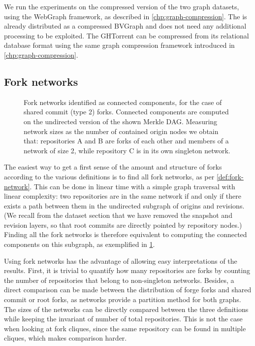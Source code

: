 We run the experiments on the compressed version of the two graph datasets,
using the WebGraph framework, as described in \cref{chp:graph-compression}.
The \SWHGD{} is already distributed as a compressed BVGraph and does not need
any additional processing to be exploited.
The GHTorrent can be compressed from its relational
database format using the same graph compression framework introduced in
\cref{chp:graph-compression}.

\subsection{Fork networks}
\label{sec:methodology-fork-networks}

\begin{figure}[t]
  \centering
  
  \caption{Fork networks identified as connected components, for the case of
    shared commit (type 2) forks. Connected components are computed on the
    undirected version of the shown Merkle DAG. Measuring network sizes as the
    number of contained origin nodes we obtain that: repositories A and B
    are forks of each other and members of a network of size 2, while
    repository C is in its own singleton network.}
  \label{fig:fork-clusters}
\end{figure}

The easiest way to get a first sense of the amount and structure of forks
according to the various definitions is to find all fork networks, as per
\cref{def:fork-network}. This can be done in linear time with a
simple graph traversal with linear complexity: two repositories are in the same
network if and only if there exists a path between them in the undirected
subgraph of origins and revisions. (We recall from the dataset section that we
have removed the snapshot and revision layers, so that root commits are
directly pointed by repository nodes.) Finding all the fork networks is
therefore equivalent to computing the connected components on this subgraph, as
exemplified in \cref{fig:fork-clusters}.

Using fork networks has the advantage of allowing easy interpretations of the
results. First, it is trivial to quantify how many repositories are forks by
counting the number of repositories that belong to non-singleton networks.
Besides, a direct comparison can be made between the distribution of forge
forks and shared commit or root forks, as networks provide a partition method
for both graphs. The sizes of the networks can be directly compared between
the three definitions while keeping the invariant of number of total
repositories.
This is not the case when looking at fork cliques, since the same repository
can be found in multiple cliques, which makes comparison harder.

